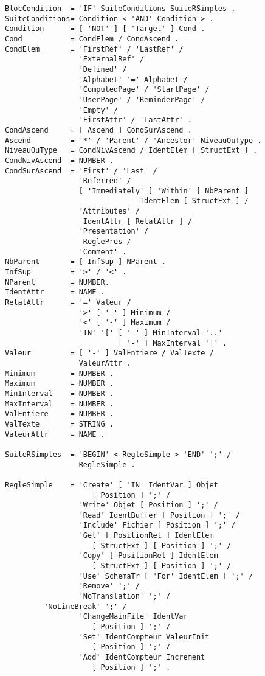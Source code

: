 {\begin{verbatim}
BlocCondition  = 'IF' SuiteConditions SuiteRSimples .
SuiteConditions= Condition < 'AND' Condition > .
Condition      = [ 'NOT' ] [ 'Target' ] Cond .
Cond           = CondElem / CondAscend .
CondElem       = 'FirstRef' / 'LastRef' /
                 'ExternalRef' /
                 'Defined' /
                 'Alphabet' '=' Alphabet /
                 'ComputedPage' / 'StartPage' / 
                 'UserPage' / 'ReminderPage' /
                 'Empty' /
                 'FirstAttr' / 'LastAttr' .
CondAscend     = [ Ascend ] CondSurAscend .
Ascend         = '*' / 'Parent' / 'Ancestor' NiveauOuType .
NiveauOuType   = CondNivAscend / IdentElem [ StructExt ] .
CondNivAscend  = NUMBER .
CondSurAscend  = 'First' / 'Last' /
                 'Referred' /
                 [ 'Immediately' ] 'Within' [ NbParent ]
                               IdentElem [ StructExt ] /
                 'Attributes' /
                  IdentAttr [ RelatAttr ] /
                 'Presentation' /
                  ReglePres /
                 'Comment' .		    
NbParent       = [ InfSup ] NParent .
InfSup         = '>' / '<' .
NParent        = NUMBER.
IdentAttr      = NAME .
RelatAttr      = '=' Valeur /
                 '>' [ '-' ] Minimum /
                 '<' [ '-' ] Maximum /
                 'IN' '[' [ '-' ] MinInterval '..'
                          [ '-' ] MaxInterval ']' .
Valeur         = [ '-' ] ValEntiere / ValTexte /
                 ValeurAttr .
Minimum        = NUMBER .
Maximum        = NUMBER .
MinInterval    = NUMBER .
MaxInterval    = NUMBER .
ValEntiere     = NUMBER .
ValTexte       = STRING .
ValeurAttr     = NAME .

SuiteRSimples  = 'BEGIN' < RegleSimple > 'END' ';' / 
                 RegleSimple .

RegleSimple    = 'Create' [ 'IN' IdentVar ] Objet
                    [ Position ] ';' /
                 'Write' Objet [ Position ] ';' /
                 'Read' IdentBuffer [ Position ] ';' /
                 'Include' Fichier [ Position ] ';' /
                 'Get' [ PositionRel ] IdentElem 
                    [ StructExt ] [ Position ] ';' /
                 'Copy' [ PositionRel ] IdentElem 
                    [ StructExt ] [ Position ] ';' /
                 'Use' SchemaTr [ 'For' IdentElem ] ';' /
                 'Remove' ';' /
                 'NoTranslation' ';' /
		 'NoLineBreak' ';' /
                 'ChangeMainFile' IdentVar
                    [ Position ] ';' /
                 'Set' IdentCompteur ValeurInit
                    [ Position ] ';' /
                 'Add' IdentCompteur Increment
                    [ Position ] ';' .


\end{verbatim}}
